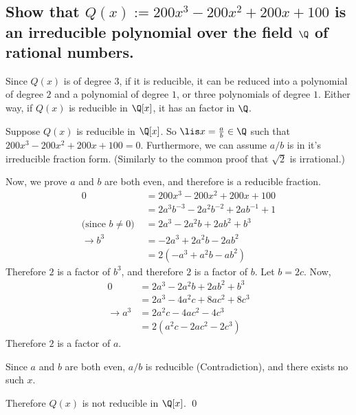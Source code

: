 \section[Problem 5]{
}  
    \subsection[(i)]{
        Show that $Q(x) := 200x^3 - 200x^2 + 200x + 100$ is an irreducible polynomial
        over the field $\Q$ of rational numbers.
    }
        Since $Q(x)$ is of degree $3$,
        if it is reducible, it can be reduced into a polynomial of degree $2$ and 
        a polynomial of degree $1$, or three polynomials of degree $1$.
        Either way, if $Q(x)$ is reducible in $\Q[x]$, it has an factor in $\Q$.

        Suppose $Q(x)$ is reducible in $\Q[x]$.
        So $\lis x =\frac{a}{b} \in \Q$ such that 
        $200x^3 - 200x^2 + 200x + 100 = 0$.
        Furthermore, we can assume $a/b$ is in it's irreducible fraction form.
        (Similarly to the common proof that $\sqrt{2}$ is irrational.)

        Now, we prove $a$ and $b$ are both even, and therefore is a reducible fraction.
        \begin{align*}
            0 &= 200x^3 - 200x^2 + 200x + 100  \\
            &= 2a^3b^{-3} - 2a^2b^{-2} + 2ab^{-1} + 1  \\
            \text{(since $b\neq 0$) }
            &= 2a^3 - 2a^2b + 2ab^2 + b^3  \\
            \to b^3 &= -2a^3 + 2a^2b - 2ab^2 \\
            &= 2(-a^3 + a^2b - ab^2) 
        \end{align*}
        Therefore $2$ is a factor of $b^3$, and therefore $2$ is a factor of $b$.
        Let $b = 2c$.
        Now,
        \begin{align*}
            0&=2a^3 - 2a^2b + 2ab^2 + b^3\\
            &= 2a^3 - 4a^2c + 8ac^2 + 8c^3\\
            \to a^3 &= 2a^2c - 4ac^2 - 4c^3 \\
            &= 2(a^2c - 2ac^2 - 2c^3)
        \end{align*}
        Therefore $2$ is a factor of $a$.

        Since $a$ and $b$ are both even, $a/b$ is reducible (Contradiction), and there exists no such $x$.

        Therefore $Q(x)$ is not reducible in $\Q[x]$.
        \qed

